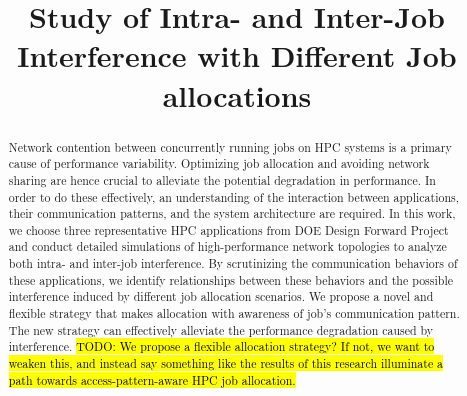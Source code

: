 \documentclass[conference]{IEEEtran}
\newcommand{\TODO}[1]{\hl{TODO: #1}}
\begin{document}
%
\title{Study of Intra- and Inter-Job Interference with Different Job allocations}
\author{



}

\maketitle


\begin{abstract} 

Network contention between concurrently running jobs on HPC systems is a primary cause of performance variability. Optimizing job allocation and avoiding network sharing are hence crucial to alleviate the potential degradation in performance. In order to do these effectively, an understanding of the interaction between applications, their communication patterns, and the system architecture are required. In this work, we choose three representative HPC applications from DOE Design Forward Project and conduct detailed simulations of high-performance network topologies to analyze both intra- and inter-job interference. By scrutinizing the communication behaviors of these applications, we identify relationships between these behaviors and the possible interference induced by different job allocation scenarios. We propose a novel and flexible strategy that makes allocation with awareness of job's communication pattern. The new strategy can effectively alleviate the performance degradation caused by interference. \TODO{We propose a flexible allocation strategy? If not, we want to weaken this, and instead say something like the results of this research illuminate a path towards access-pattern-aware HPC job allocation.}


\end{abstract}
\end{document}
